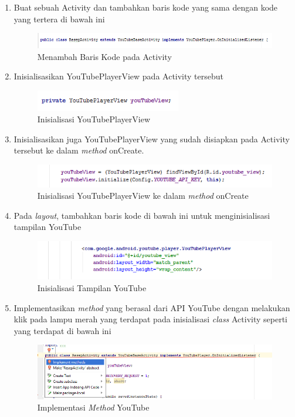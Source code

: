 \begin{enumerate}
		\item Buat sebuah Activity dan tambahkan baris kode yang sama dengan kode yang tertera di bawah ini 
		\begin{figure}[H]
			\centering
			\includegraphics[width=1\textwidth]{gambar/y6}
			\caption{Menambah Baris Kode pada Activity}
		\end{figure}
		
		\item Inisialisasikan YouTubePlayerView pada Activity tersebut
		\begin{figure}[H]
			\centering
			\includegraphics[width=0.6\textwidth]{gambar/y7}
			\caption{Inisialisasi YouTubePlayerView}
		\end{figure}
	
		\item Inisialisasikan juga YouTubePlayerView yang sudah disiapkan pada Activity tersebut ke dalam \textit{method} onCreate.
		\begin{figure}[H]
			\centering
			\includegraphics[width=1\textwidth]{gambar/y8}
			\caption{Inisialisasi YouTubePlayerView ke dalam \textit{method} onCreate}
		\end{figure}
		
		\item Pada \textit{layout}, tambahkan baris kode di bawah ini untuk menginisialisasi tampilan YouTube
		\begin{figure}[H]
			\centering
			\includegraphics[width=1\textwidth]{gambar/y9}
			\caption{Inisialisasi Tampilan YouTube}
		\end{figure}
		
		\item Implementasikan \textit{method} yang berasal dari API YouTube dengan melakukan klik pada lampu merah yang terdapat pada inisialisasi \textit{class} Activity seperti yang terdapat di bawah ini
		\begin{figure}[H]
			\centering
			\includegraphics[width=1\textwidth]{gambar/y10-a}
			\caption{Implementasi \textit{Method} YouTube}
		\end{figure}
	

\end{enumerate}
